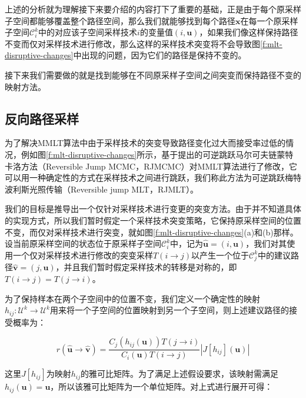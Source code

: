 上述的分析就为理解接下来要介绍的内容打下了重要的基础，正是由于每个原采样子空间都能够覆盖整个路径空间，那么我们就能够找到每个路径${\mathbf{x}}$在每一个原采样子空间$\mathscr{C}^{k}_i$中的对应该子空间采样技术$i$的变量值$(i,\mathbf{u})$，如果我们像这样保持路径不变而仅对采样技术进行修改，那么这样的采样技术突变将不会导致图\ref{f:mlt-disruptive-changes}中出现的问题，因为它们的路径是保持不变的。

接下来我们需要做的就是找到能够在不同原采样子空间之间突变而保持路径不变的映射方法。




\subsection{反向路径采样}
为了解决MMLT算法中由于采样技术的突变导致路径变化过大而接受率过低的情况，例如图\ref{f:mlt-disruptive-changes}所示，\cite{a:ReversibleJumpMetropolisLightTransportusingInverseMappings}基于\cite{a:ReversiblejumpMarkovchainMonteCarlocomputationandBayesianmodeldetermination}提出的可逆跳跃马尔可夫链蒙特卡洛方法（Reversible Jump MCMC，RJMCMC）对MMLT算法进行了修改，它可以用一种确定性的方式在采样技术之间进行跳跃，我们称此方法为可逆跳跃梅特波利斯光照传输（Reversible jump MLT，RJMLT）。

我们的目标是推导出一个仅针对采样技术进行变更的突变方法。由于并不知道具体的实现方式，所以我们暂时假定一个采样技术突变策略，它保持原采样空间的位置不变，而仅对采样技术进行突变，就如图\ref{f:mlt-disruptive-changes}(a)和(b)那样。设当前原采样空间的状态位于原采样子空间$\mathscr{C}^{k}_i$中，记为$\hat{\mathbf{u}}=(i,{\mathbf{u}})$，我们对其使用一个仅对采样技术进行修改的突变采样$T(i\to j)$以产生一个位于$\mathscr{C}^{k}_j$中的建议路径$\hat{\mathbf{v}}=(j,{\mathbf{u}})$，并且我们暂时假定采样技术的转移是对称的，即$T(i\to j)=T(j\to i)$。

为了保持样本在两个子空间中的位置不变，我们定义一个确定性的映射$h_{ij}:\mathcal{U}^{k}\to\mathcal{U}^{k}$用来将一个子空间的位置映射到另一个子空间，则上述建议路径的接受概率为：

\begin{equation}
	r(\hat{\mathbf{u}}\to\hat{\mathbf{v}})=\frac{C_j(h_{ij}({\mathbf{u}}))T(j\to i)}{C_i({\mathbf{u}})T(i\to j)}|J[h_{ij}]({\mathbf{u}})|
\end{equation}

\noindent 这里$J[h_{ij}]$为映射$h_{ij}$的雅可比矩阵。为了满足上述假设要求，该映射需满足$h_{ij}({\mathbf{u}})={\mathbf{u}}$，所以该雅可比矩阵为一个单位矩阵。对上式进行展开可得：

